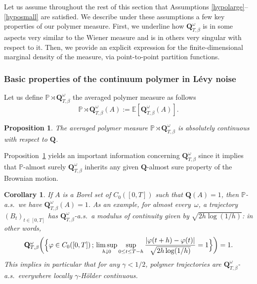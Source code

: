 \documentclass[JEP,XML,SOM,Unicode,published]{cedram}
\newtheorem{proposition}[theorem]{Proposition}
\newtheorem{cor}[theorem]{Corollary}
\theoremstyle{definition}
\newcommand{\bQ}{{\ensuremath{\mathbf Q}} }
\newcommand{\bbE}{{\ensuremath{\mathbb E}} }
\newcommand{\bbP}{{\ensuremath{\mathbb P}} }
\let\gb\beta
\let\go\omega
\begin{document}
\label{sec:mainprop}

Let us assume throughout the rest of this section that Assumptions \eqref{hypolarge}--\eqref{hyposmall} are satisfied.
We describe under these assumptions a few key properties of our polymer measure. First, we underline how $\bQ^{\go}_{T,\beta}$ is in some aspects very similar to the Wiener measure and is in others very singular with respect to it.
Then, we provide an explicit expression for the finite-dimensional marginal density of the measure, via point-to-point partition functions.

\subsubsection{Basic properties of the continuum polymer in Lévy noise}
\label{bazics}

Let us define $\bbP\rtimes\bQ^{\go}_{T,\beta}$ the averaged polymer measure as follows
\begin{equation}
\bbP\rtimes\bQ^{\go}_{T,\beta}(A):= \bbE[\bQ^{\go}_{T,\beta}(A) ].
\end{equation}

\begin{proposition} \label{abzolute}
The averaged polymer measure
$\bbP\rtimes \bQ^{\go}_{T,\beta}$ is absolutely continuous with respect to $\bQ$.
\end{proposition}

 Proposition~\ref{abzolute} yields an important information concerning $\bQ^{\go}_{T,\beta}$ since it implies that $\bbP$-almost surely $ \bQ^{\go}_{T,\beta}$ inherits any given $\bQ$-almost sure property of the Brownian motion.

\begin{cor}
If $A$ is a Borel set of $C_0([0,T])$ such that $\bQ(A)=1$, then $\bbP$-a.s.\ we have $ \bQ^{\go}_{T,\beta}(A)=1$.
As an example,
for almost every~$\go$, a trajectory $(B_t)_{t\in [0,T]}$
has $\bQ_{T,\gb}^{\go}$-a.s.\ a modulus of continuity
given by $\sqrt{2h \log(1/h)}$: in other words,
\[
\bQ_{T,\gb}^{\go} \bigg(\Bigl\{ \varphi \in C_0([0,T]) \,; \, \limsup_{h\downarrow 0} \sup_{ 0\leq t \leq T-h} \frac{|\varphi(t+h) - \varphi(t)|}{ \sqrt{2h \log(1/h)}} =1 \Bigr\} \bigg) =1.
\]
This implies in particular that for any $\gamma<1/2$,
polymer trajectories are $\bQ_{T,\gb}^{\go}$-a.s.\ everywhere locally $\gamma$-Hölder continuous.
\end{cor}
\end{document}
